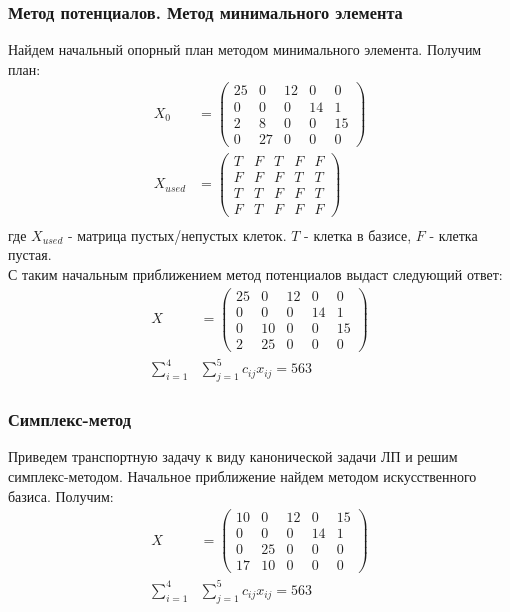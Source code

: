 \subsubsection{Метод потенциалов. Метод минимального элемента}
Найдем начальный опорный план методом минимального элемента. Получим план:
\begin{align*}
	X_0 &=
		\begin{pmatrix} 
			25 & 0 & 12 & 0 & 0 \\ 
			0 & 0 & 0 & 14 & 1 \\ 
			2 & 8 & 0 & 0 & 15 \\ 
			0 & 27 & 0 & 0 & 0
		\end{pmatrix} \\
	X_{used} &=
		\begin{pmatrix} 
			T & F & T & F & F \\ 
			F & F & F & T & T \\ 
			T & T & F & F & T \\ 
			F & T & F & F & F
		\end{pmatrix} \\
\end{align*}
где $X_{used}$ - матрица пустых/непустых клеток. $T$ - клетка в базисе, $F$ - клетка пустая. \\
С таким начальным приближением метод потенциалов выдаст следующий ответ:
\begin{align*}
	X &=
		\begin{pmatrix} 
			25 & 0 & 12 & 0 & 0 \\ 
			0 & 0 & 0 & 14 & 1 \\ 
			0 & 10 & 0 & 0 & 15 \\ 
			2 & 25 & 0 & 0 & 0
		\end{pmatrix} \\
	\sum_{i=1}^4 &\sum_{j=1}^5 c_{ij} x_{ij} = 563
\end{align*}

\subsubsection{Симплекс-метод}
Приведем транспортную задачу к виду канонической задачи ЛП и решим симплекс-методом. Начальное приближение найдем методом искусственного базиса. Получим:
\begin{align*}
	X &=
		\begin{pmatrix} 
			10 & 0 & 12 & 0 & 15 \\ 
			0 & 0 & 0 & 14 & 1 \\ 
			0 & 25 & 0 & 0 & 0 \\ 
			17 & 10 & 0 & 0 & 0
		\end{pmatrix} \\
	\sum_{i=1}^4 &\sum_{j=1}^5 c_{ij} x_{ij} = 563
\end{align*}

